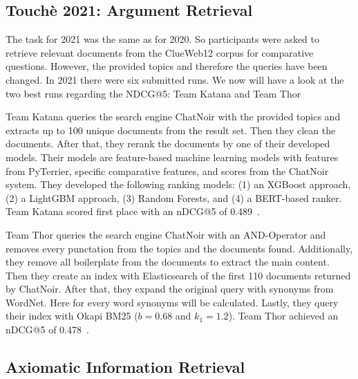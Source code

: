 \subsection{Touchè 2021: Argument Retrieval}

The task for 2021 was the same as for 2020.
So participants were asked to retrieve relevant documents from the ClueWeb12 corpus for comparative questions.
However, the provided topics and therefore the queries have been changed.
In 2021 there were six submitted runs.
We now will have a look at the two best runs regarding the NDCG@5: Team Katana and Team Thor~\cite{BondarenkoFBGAPBSWPH2021}

Team Katana queries the search engine ChatNoir with the provided topics and extracts up to 100 unique documents from the result set.
Then they clean the documents. 
After that, they rerank the documents by one of their developed models.
Their models are feature-based machine learning models with features from PyTerrier, specific comparative features, and scores from the ChatNoir system. They developed the following ranking models:
(1) an XGBoost approach, (2) a LightGBM approach, (3) Random Forests, and (4) a BERT-based ranker.
Team Katana scored first place with an nDCG@5 of 0.489~\cite{ChekalinaP2021}.

Team Thor queries the search engine ChatNoir with an AND-Operator and removes every punctation from the topics and the documents found.
Additionally, they remove all boilerplate from the documents to extract the main content.
Then they create an index with Elasticsearch of the first 110 documents returned by ChatNoir.
After that, they expand the original query with synonyms from WordNet.
Here for every word synonyms will be calculated.
Lastly, they query their index with Okapi BM25 (\( b = 0.68 \) and \( k_1 = 1.2 \)).
Team Thor achieved an nDCG@5 of 0.478~\cite{ShirshakovaW2021}.

\subsection{Axiomatic Information Retrieval}

